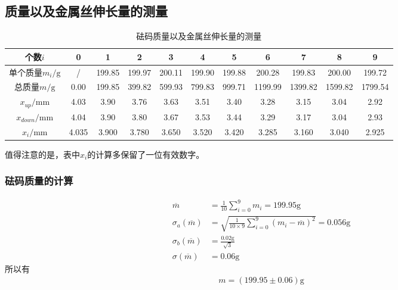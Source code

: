 \documentclass[a4paper]{ctexart}
\begin{document}
	\subsection{质量以及金属丝伸长量的测量}
	\begin{table}[H]
		\begin{center}
			\caption{砝码质量以及金属丝伸长量的测量}
			\begin{tabular}{c|cccccccccc}
				个数$i$&0&1&2&3&4&5&6&7&8&9\\\hline
				单个质量$m_i/\mathrm{g}$&/&199.85&199.97&200.11&199.90&199.88&200.28&199.83&200.00&199.72\\\hline
				总质量$m/\mathrm{g}$&0.00&199.85&399.82&599.93&799.83&999.71&1199.99&1399.82&1599.82&1799.54\\\hline
				$x_{up}/\mathrm{mm}$&4.03&3.90&3.76&3.63&3.51&3.40&3.28&3.15&3.04&2.92\\\hline
				$x_{down}/\mathrm{mm}$&4.04&3.90&3.80&3.67&3.53&3.44&3.29&3.17&3.04&2.93\\\hline
				$x_i/\mathrm{mm}$&4.035&3.900&3.780&3.650&3.520&3.420&3.285&3.160&3.040&2.925
			\end{tabular}
		\end{center}
	\end{table}
	值得注意的是，表中$x_i$的计算多保留了一位有效数字。
	\subsubsection{砝码质量的计算}
	\begin{align}
		\overline{m}&=\frac{1}{10}\sum_{i=0}^{9}m_i=199.95\mathrm{g}\\
		\sigma_a(\overline{m})&=\sqrt{\frac{1}{10\times9}\sum_{i=0}^{9}(m_i-\overline{m})^2}=0.056\mathrm{g}\\
		\sigma_b(\overline{m})&=\frac{0.02\mathrm{g}}{\sqrt{3}}\\
		\sigma(\overline{m})&=0.06\mathrm{g}
	\end{align}
	所以有
	\begin{align}
		m=(199.95\pm 0.06)\mathrm{g}
	\end{align}
\end{document}
